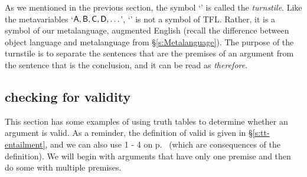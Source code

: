 As we mentioned in the previous section, the symbol `\proves' is called the \textit{turnstile}. Like the metavariables `$\mathsf{A}, \mathsf{B}, \mathsf{C}, \mathsf{D}, \ldots$', `\proves' is not a symbol of TFL. Rather, it is a symbol of our metalanguage, augmented English (recall the difference between object language and metalanguage from \S\ref{s:Metalanguage}). The purpose of the turnstile is to separate the sentences that are the premises of an argument from the sentence that is the conclusion, and it can be read as \textit{therefore}.


\subsection{checking for validity}

This section has some examples of using truth tables to determine whether an argument is valid. As a reminder, the definition of valid is given in \S\ref{s:tt-entailment}, and we can also use 1 - 4 on p.~\pageref{s:tt-validity} (which are consequences of the definition). We will begin with arguments that have only one premise and then do some with multiple premises.

